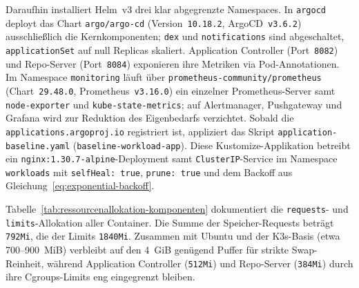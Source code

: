 Daraufhin installiert Helm~v3 drei klar abgegrenzte Namespaces. In \texttt{argocd} deployt das Chart \texttt{argo/argo-cd} (Version~\texttt{10.18.2}, ArgoCD~\texttt{v3.6.2}) ausschließlich die Kernkomponenten; \texttt{dex} und \texttt{notifications} sind abgeschaltet, \texttt{applicationSet} auf null Replicas skaliert.\autocite{argo_helm_2026} Application Controller (Port~\texttt{8082}) und Repo-Server (Port~\texttt{8084}) exponieren ihre Metriken via Pod-Annotationen. Im Namespace \texttt{monitoring} läuft über \texttt{prometheus-community/\allowbreak{}prometheus} (Chart~\texttt{29.48.0}, Prometheus~\texttt{v3.16.0}) ein einzelner Prometheus-Server samt \texttt{node-exporter} und \texttt{kube-state-metrics}; auf Alertmanager, Pushgateway und Grafana wird zur Reduktion des Eigenbedarfs verzichtet.\autocite{prometheus_helm_2026} Sobald die  \texttt{applications.\allowbreak{}argoproj.io} registriert ist, appliziert das Skript \texttt{application-\allowbreak{}baseline.yaml} (\texttt{baseline-\allowbreak{}workload-app}). Diese Kustomize-Applikation betreibt ein \texttt{nginx:\allowbreak{}1.30.7-alpine}-Deployment samt \texttt{ClusterIP}-Service im Namespace \texttt{workloads} mit \texttt{selfHeal: true}, \texttt{prune: true} und dem Backoff aus Gleichung~\ref{eq:exponential-backoff}.

Tabelle~\ref{tab:ressourcenallokation-komponenten} dokumentiert die \texttt{requests}- und \texttt{limits}-Allokation aller Container. Die Summe der Speicher-Requests beträgt \texttt{792Mi}, die der Limits \texttt{1840Mi}. Zusammen mit Ubuntu und der K3s-Basis (etwa 700--900~MiB) verbleibt auf den 4~GiB  genügend Puffer für strikte Swap-Reinheit, während Application Controller (\texttt{512Mi}) und Repo-Server (\texttt{384Mi}) durch ihre Cgroups-Limits eng eingegrenzt bleiben.

